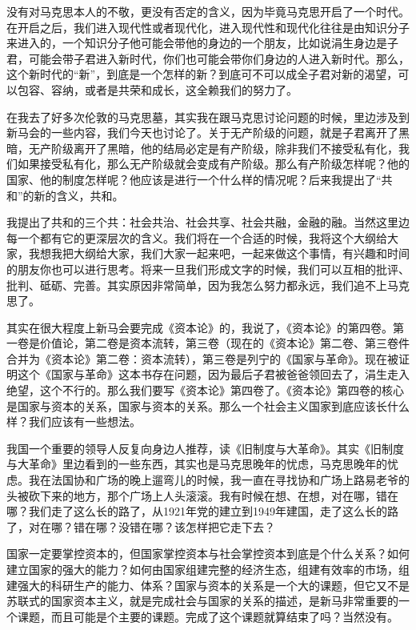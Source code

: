 \documentclass[UTF8, 12pt, a4paper]{ctexrep}
\begin{document}
没有对马克思本人的不敬，更没有否定的含义，因为毕竟马克思开启了一个时代。在开启之后，我们进入现代性或者现代化，进入现代性和现代化往往是由知识分子来进入的，一个知识分子他可能会带他的身边的一个朋友，比如说涓生身边是子君，可能会带子君进入新时代，你们也可能会带你们身边的人进入新时代。那么，这个新时代的“新”，到底是一个怎样的新？到底可不可以成全子君对新的渴望，可以包容、容纳，或者是共荣和成长，这全赖我们的努力了。

在我去了好多次伦敦的马克思墓，其实我在跟马克思讨论问题的时候，里边涉及到新马会的一些内容，我们今天也讨论了。关于无产阶级的问题，就是子君离开了黑暗，无产阶级离开了黑暗，他的结局必定是有产阶级，除非我们不接受私有化，我们如果接受私有化，那么无产阶级就会变成有产阶级。那么有产阶级怎样呢？他的国家、他的制度怎样呢？他应该是进行一个什么样的情况呢？后来我提出了“共和”的新的含义，共和。

我提出了共和的三个共：社会共治、社会共享、社会共融，金融的融。当然这里边每一个都有它的更深层次的含义。我们将在一个合适的时候，我将这个大纲给大家，我想我把大纲给大家，我们大家一起来吧，一起来做这个事情，有兴趣和时间的朋友你也可以进行思考。将来一旦我们形成文字的时候，我们可以互相的批评、批判、砥砺、完善。其实原因非常简单，因为我怎么努力都永远，我们追不上马克思了。

其实在很大程度上新马会要完成《资本论》的，我说了，《资本论》的第四卷。第一卷是价值论，第二卷是资本流转，第三卷（现在的《资本论》第二卷、第三卷件合并为《资本论》第二卷：资本流转），第三卷是列宁的《国家与革命》。现在被证明这个《国家与革命》这本书存在问题，因为最后子君被爸爸领回去了，涓生走入绝望，这个不行的。那么我们要写《资本论》第四卷了。《资本论》第四卷的核心是国家与资本的关系，国家与资本的关系。那么一个社会主义国家到底应该长什么样？我们应该有一些想法。

我国一个重要的领导人反复向身边人推荐，读《旧制度与大革命》。其实《旧制度与大革命》里边看到的一些东西，其实也是马克思晚年的忧虑，马克思晚年的忧虑。我在法国协和广场的晚上遛弯儿的时候，我一直在寻找协和广场上路易老爷的头被砍下来的地方，那个广场上人头滚滚。我有时候在想、在想，对在哪，错在哪？我们走了这么长的路了，从1921年党的建立到1949年建国，走了这么长的路了，对在哪？错在哪？没错在哪？该怎样把它走下去？

国家一定要掌控资本的，但国家掌控资本与社会掌控资本到底是个什么关系？如何建立国家的强大的能力？如何由国家组建完整的经济生态，组建有效率的市场，组建强大的科研生产的能力、体系？国家与资本的关系是一个大的课题，但它又不是苏联式的国家资本主义，就是完成社会与国家的关系的描述，是新马非常重要的一个课题，而且可能是个主要的课题。完成了这个课题就算结束了吗？当然没有。
\end{document}
